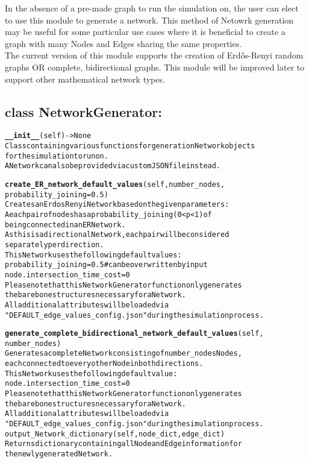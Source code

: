 In the absence of a pre-made graph to run the simulation on, the user can elect to use this module to generate a network.  This method of Netowrk generation may be useful for some particular use cases where it is beneficial to create a graph with many Nodes and Edges sharing the same properties.\\

\noindent The current version of this module supports the creation of Erdős-Renyi random graphs OR complete, bidirectional graphs.  This module will be improved later to support other mathematical network types.

\subsection{class NetworkGenerator:}

\begin{alltt}
\textbf{__init__}(self) -> None
Class containing various functions for generation Network objects 
for the simulation to run on.
A Network can also be provided via custom JSON file instead.

\textbf{create_ER_network_default_values}(self, number_nodes,
probability_joining=0.5)
Creates an Erdos Renyi Network based on the given parameters:
A each pair of nodes has a probability_joining (0 < p < 1) of 
being connected in an ER Network.
As this is a directional Network, each pair will be considered 
separately per direction.
This Network uses the following default values:
    probability_joining = 0.5     # can be overwritten by input
    node.intersection_time_cost = 0
Please note that this NetworkGenerator function only generates 
the barebone structures necessary for a Network. 
All additional attributes will be loaded via
"DEFAULT_edge_values_config.json" during the simulation process.

\textbf{generate_complete_bidirectional_network_default_values}(self,
number_nodes)
Generates a complete Network consisting of number_nodes Nodes, 
each connected to every other Node in both directions.
This Network uses the following default value:
    node.intersection_time_cost = 0
Please note that this NetworkGenerator function only generates 
the barebone structures necessary for a Network. 
All additional attributes will be loaded via
"DEFAULT_edge_values_config.json" during the simulation process.
output_Network_dictionary(self, node_dict, edge_dict)
Returns dictionary containing all Node and Edge information for 
the newly generated Network.

\end{alltt}

